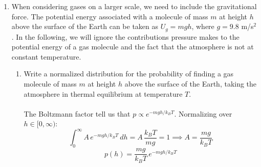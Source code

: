\documentclass{article}
\begin{document}
\begin{enumerate}
\begin{enumerate}
            \item Suppose that the temperature is fixed at $7\,\varepsilon/k_B$. How many atoms are in each state? What is the total energy of the system? What is the resulting entropy?
            \\
            \\$T = 7\,\varepsilon/k_B \implies x = e^{-1/7} = 0.86688$:
            \[n_1 = 2.122\times10^{20}, \quad n_2 = 1.839\times10^{20}, \quad n_3 = 1.039\times10^{20}\]
            \[U = n_2\varepsilon + 5n_3\varepsilon = \boxed{7.034\times10^{20}\,\varepsilon}\]
            \[S = \boxed{5.291\times10^{20}\,k_B}\]
        \end{enumerate}

        \item When considering gases on a larger scale, we need to include the gravitational force. The potential energy associated with a molecule of mass $m$ at height $h$ above the surface of the Earth can be taken as $U_g = mgh$, where $g = 9.8$ m/s$^2$. In the following, we will ignore the contributions pressure makes to the potential energy of a gas molecule and the fact that the atmosphere is not at constant temperature.

        \begin{enumerate}
            \item Write a normalized distribution for the probability of finding a gas molecule of mass $m$ at height $h$ above the surface of the Earth, taking the atmosphere in thermal equilibrium at temperature $T$.
            \\
            \\The Boltzmann factor tell us that $p \propto e^{-mgh/k_BT}$. Normalizing over $h\in[0,\infty)$:
            \[\int_0^\infty A\,e^{-mgh/k_BT}\,dh = A\,\frac{k_BT}{mg} = 1 \implies A = \frac{mg}{k_BT}\]
            \[\boxed{p(h) = \frac{mg}{k_BT}\,e^{-mgh/k_BT}}\]


\end{enumerate}
\end{enumerate}
\end{document}
